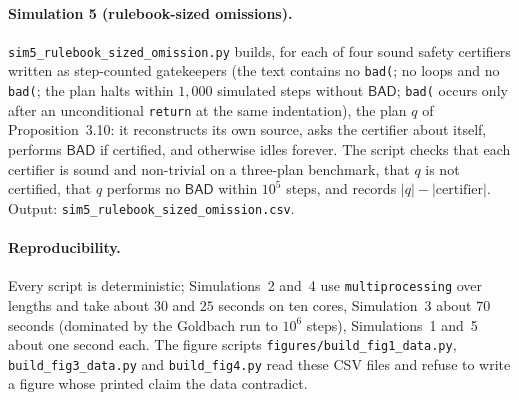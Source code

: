 \documentclass[11pt]{article}
\newcommand{\bad}{\mathsf{BAD}}
\begin{document}
\paragraph{Simulation 5 (rulebook-sized omissions).} \texttt{sim5\_rulebook\_sized\_omission.py} builds, for each of four sound safety certifiers written as step-counted gatekeepers (the text contains no \texttt{bad(}; no loops and no \texttt{bad(}; the plan halts within $1{,}000$ simulated steps without $\bad$; \texttt{bad(} occurs only after an unconditional \texttt{return} at the same indentation), the plan $q$ of Proposition~3.10: it reconstructs its own source, asks the certifier about itself, performs $\bad$ if certified, and otherwise idles forever. The script checks that each certifier is sound and non-trivial on a three-plan benchmark, that $q$ is not certified, that $q$ performs no $\bad$ within $10^5$ steps, and records $|q|-|\text{certifier}|$. Output: \texttt{sim5\_rulebook\_sized\_omission.csv}.

\paragraph{Reproducibility.} Every script is deterministic; Simulations~2 and~4 use \texttt{multiprocessing} over lengths and take about $30$ and $25$ seconds on ten cores, Simulation~3 about $70$ seconds (dominated by the Goldbach run to $10^6$ steps), Simulations~1 and~5 about one second each. The figure scripts \texttt{figures/build\_fig1\_data.py}, \texttt{build\_fig3\_data.py} and \texttt{build\_fig4.py} read these CSV files and refuse to write a figure whose printed claim the data contradict.
\end{document}
